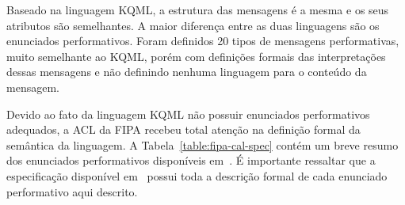 Baseado na linguagem KQML, a estrutura das mensagens é a mesma e os seus atributos são semelhantes. A maior diferença entre as duas linguagens são os enunciados performativos. Foram definidos 20 tipos de mensagens performativas, muito semelhante ao KQML, porém com definições formais das interpretações dessas mensagens e não definindo nenhuma linguagem para o conteúdo da mensagem.

Devido ao fato da linguagem KQML não possuir enunciados performativos adequados, a ACL da FIPA recebeu total atenção na definição formal da semântica da linguagem. A Tabela~\ref{table:fipa-cal-spec} contém um breve resumo dos enunciados performativos disponíveis em~\cite{fipa-cal-spec}. É importante ressaltar que a especificação disponível em~\cite{fipa-cal-spec} possui toda a descrição formal de cada enunciado performativo aqui descrito.

